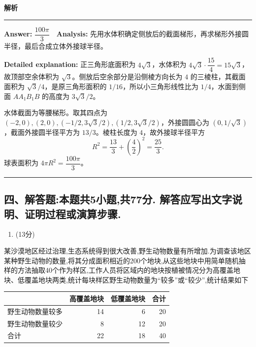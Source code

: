 \documentclass[UTF8,12pt,a4paper]{ctexart}
\renewcommand{\labelenumi}{\arabic{enumi}.}
\providecommand{\toprule}{\hline}
\providecommand{\midrule}{\hline}
\providecommand{\bottomrule}{\hline}
\newenvironment{examSolutionBox}{%
  \par\medskip\begingroup
  \setlength{\leftskip}{1.0em}\setlength{\rightskip}{0.9em}%
  \noindent\textcolor{SolutionTeal}{\bfseries\large 解析}\par
  \smallskip\noindent\textcolor{SolutionRule}{\rule{\dimexpr\linewidth-\leftskip-\rightskip\relax}{0.8pt}}\par
  \smallskip\color{SolutionInk}%
}{%
  \par\smallskip\noindent\textcolor{SolutionRule}{\rule{\dimexpr\linewidth-\leftskip-\rightskip\relax}{0.8pt}}\par
  \endgroup\medskip
}
\providecommand{\tightlist}{%
  \setlength{\itemsep}{0pt}\setlength{\parskip}{0pt}}
\begin{document}
\begin{examSolutionBox}

\textbf{Answer:} \(\dfrac{100\pi}{3}\)　\textbf{Analysis:} 先用水体积确定侧放后的截面梯形，再求梯形外接圆半径，最后合成立体外接球半径。

\textbf{Detailed explanation:} 正三角形底面积为 \(4\sqrt3\)，水体积为 \(4\sqrt3\cdot\dfrac{15}{4}=15\sqrt3\)，故顶部空余体积为 \(\sqrt3\)。侧放后空余部分是沿侧棱方向长为 \(4\) 的三棱柱，其截面面积为 \(\sqrt3/4\)，是原三角形面积的 \(1/16\)，所以小三角形线性比为 \(1/4\)，水面到侧面 \(AA_1B_1B\) 的高度为 \(3\sqrt3/2\)。

水体截面为等腰梯形。取其四点为 \((-2,0),(2,0),(-1/2,3\sqrt3/2),(1/2,3\sqrt3/2)\)，外接圆圆心为 \((0,1/\sqrt3)\)，截面外接圆半径平方为 \(13/3\)。棱柱长度为 \(4\)，故外接球半径平方
\[
   R^2=\frac{13}{3}+\left(\frac42\right)^2=\frac{25}{3}.
   \]
球表面积为 \(4\pi R^2=\dfrac{100\pi}{3}\)。

\end{examSolutionBox}

\subsection{四、解答题:本题共5小题,共77分. 解答应写出文字说明、证明过程或演算步骤.}\label{ux56dbux89e3ux7b54ux9898ux672cux9898ux51715ux5c0fux9898ux517177ux5206.-ux89e3ux7b54ux5e94ux5199ux51faux6587ux5b57ux8bf4ux660eux8bc1ux660eux8fc7ux7a0bux6216ux6f14ux7b97ux6b65ux9aa4.}

\begin{enumerate}
\def\labelenumi{\arabic{enumi}.}
\setcounter{enumi}{14}
\tightlist
\item
  (13分)
\end{enumerate}

某沙漠地区经过治理,生态系统得到很大改善,野生动物数量有所增加.为调查该地区某种野生动物的数量,将其分成面积相近的200个地块,从这些地块中用简单随机抽样的方法抽取40个作为样区,工作人员将区域内的地块按植被情况分为高覆盖地块、低覆盖地块两类,统计每块样区野生动物数量为``较多''或``较少'',统计结果如下

\begin{longtable}[]{@{}lrrr@{}}
\toprule\noalign{}
& 高覆盖地块 & 低覆盖地块 & 合计 \\
\midrule\noalign{}
\endhead
\bottomrule\noalign{}
\endlastfoot
野生动物数量较多 & 14 & 6 & 20 \\
野生动物数量较少 & 8 & 12 & 20 \\
合计 & 22 & 18 & 40 \\
\end{longtable}
\end{document}

